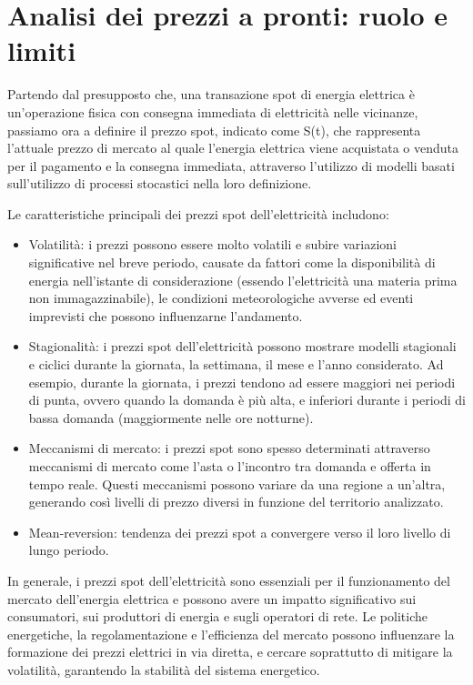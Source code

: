 \documentclass[12pt,a4paper]{report}
\begin{document}
\section{Analisi dei prezzi a pronti: ruolo e limiti}

Partendo dal presupposto che, una transazione spot di energia elettrica è un'operazione fisica con consegna immediata di elettricità nelle vicinanze, passiamo ora a definire il prezzo spot, indicato come S(t), che rappresenta l'attuale prezzo di mercato al quale l'energia elettrica viene acquistata o venduta per il pagamento e la consegna immediata, attraverso l'utilizzo di modelli basati sull'utilizzo di processi stocastici nella loro definizione.

Le caratteristiche principali dei prezzi spot dell'elettricità includono:

\begin{itemize}
   
\item Volatilità: i prezzi possono essere molto volatili e subire variazioni significative nel breve periodo, causate da fattori come la disponibilità di energia nell'istante di considerazione (essendo l'elettricità una materia prima non immagazzinabile), le condizioni meteorologiche avverse ed eventi imprevisti che possono influenzarne l'andamento.

\item Stagionalità: i prezzi spot dell'elettricità possono mostrare modelli stagionali e ciclici durante la giornata, la settimana, il mese e l'anno considerato. Ad esempio, durante la giornata, i prezzi tendono ad essere maggiori nei periodi di punta, ovvero quando la domanda è più alta, e inferiori durante i periodi di bassa domanda (maggiormente nelle ore notturne).

\item Meccanismi di mercato: i prezzi spot sono spesso determinati attraverso meccanismi di mercato come l'asta o l'incontro tra domanda e offerta in tempo reale. Questi meccanismi possono variare da una regione a un'altra, generando così livelli di prezzo diversi in funzione del territorio analizzato.

\item Mean-reversion: tendenza dei prezzi spot a convergere verso il loro livello di lungo periodo.

\end{itemize}

In generale, i prezzi spot dell'elettricità sono essenziali per il funzionamento del mercato dell'energia elettrica e possono avere un impatto significativo sui consumatori, sui produttori di energia e sugli operatori di rete. Le politiche energetiche, la regolamentazione e l'efficienza del mercato possono influenzare la formazione dei prezzi elettrici in via diretta, e cercare soprattutto di mitigare la volatilità, garantendo la stabilità del sistema energetico.
\end{document}
